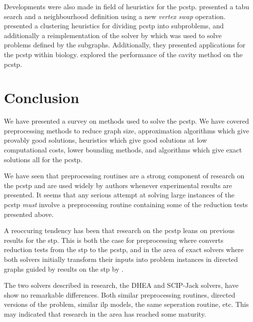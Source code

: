   Developments were also made in field of heuristics for the \gls{pcstp}. \citet{fu2014knowledge} presented a tabu search and a neighbourhood definition
  using a new \textit{vertex swap} operation.
  \citet{akhmedov2016divide} presented a clustering heuristics for dividing \gls{pcstp} into subproblems,
  and additionally a
  reimplementation of the solver by \citet{ljubic2005solving} which was used to solve problems defined by the subgraphs. Additionally, they presented
  applications for the \gls{pcstp} within biology.
  \citet{biazzo2012performance} explored the performance of the cavity method on the \gls{pcstp}.

\clearpage


\clearpage








\section{Conclusion}
We have presented a survey on methods used to solve the \acrlong{pcstp}. We have covered
preprocessing methods to reduce graph size, approximation algorithms which give provably
good solutions, heuristics which give good solutions at low computational costs, lower
bounding methods, and algorithms which give exact solutions all for the \gls{pcstp}.

We have seen that preprocessing routines are a strong component of
research on the \gls{pcstp} and are
used widely by authors whenever experimental results are presented. It seems that
any serious attempt at solving large instances of the \gls{pcstp} \textit{must} involve a
preprocessing routine containing some of the reduction tests presented above.

A reoccuring tendency has been that research on the \gls{pcstp} leans on
previous results for the \gls{stp}. This is both the case for preprocessing
where \citet{uchoa2006reduction} converts reduction tests from the \gls{stp}
to the \gls{pcstp}, and in the area of exact solvers where both solvers
initially transform their inputs into problem instances in directed graphs
guided by results on the \gls{stp} by \citet{chopra1994steiner}.

The two solvers described in research, the DHEA and SCIP-Jack solvers, have show no
remarkable differences. Both similar preprocessing routines, directed versions of the problem,
similar \gls{ilp} models, the same seperation routine, etc. This may indicated that research
in the area has reached some maturity.



